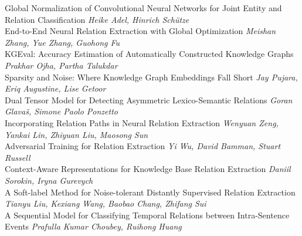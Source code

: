 \documentclass{book}
\begin{document}
    
    \noindent	Global Normalization of Convolutional Neural Networks for Joint Entity and Relation Classification \newline 
    {\itshape Heike Adel, Hinrich Schütze} \\
    
    \noindent	End-to-End Neural Relation Extraction with Global Optimization \newline 
    {\itshape Meishan Zhang, Yue Zhang, Guohong Fu} \\
    
    \noindent	KGEval: Accuracy Estimation of Automatically Constructed Knowledge Graphs \newline 
    {\itshape Prakhar Ojha, Partha Talukdar} \\
    
    \noindent	Sparsity and Noise: Where Knowledge Graph Embeddings Fall Short \newline 
    {\itshape Jay Pujara, Eriq Augustine, Lise Getoor} \\
    
    \noindent	Dual Tensor Model for Detecting Asymmetric Lexico-Semantic Relations \newline 
    {\itshape Goran Glavaš, Simone Paolo Ponzetto} \\
    
    \noindent	Incorporating Relation Paths in Neural Relation Extraction \newline 
    {\itshape Wenyuan Zeng, Yankai Lin, Zhiyuan Liu, Maosong Sun} \\
    
    \noindent	Adversarial Training for Relation Extraction \newline 
    {\itshape Yi Wu, David Bamman, Stuart Russell} \\
    
    \noindent	Context-Aware Representations for Knowledge Base Relation Extraction \newline 
    {\itshape Daniil Sorokin, Iryna Gurevych} \\
    
    \noindent	A Soft-label Method for Noise-tolerant Distantly Supervised Relation Extraction \newline 
    {\itshape Tianyu Liu, Kexiang Wang, Baobao Chang, Zhifang Sui} \\
    
    \noindent	A Sequential Model for Classifying Temporal Relations between Intra-Sentence Events \newline 
    {\itshape Prafulla Kumar Choubey, Ruihong Huang} \\
    
\end{document}
